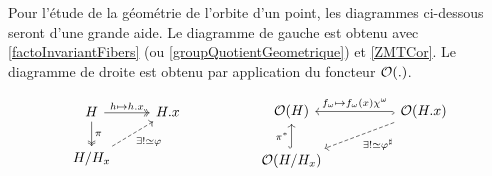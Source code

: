 Pour l'étude de la géométrie de l'orbite d'un point, les diagrammes ci-dessous seront d'une grande aide. Le diagramme de gauche est obtenu avec \ref{factoInvariantFibers} (ou \ref{groupQuotientGeometrique}) et \ref{ZMTCor}. Le diagramme de droite est obtenu par application du foncteur $\mathcal{O}(.)$.

	\begin{equation}\label{eq:DiagOrbite1}
	\begin{tikzcd}
		H \arrow[r,"h \mapsto h.x", twoheadrightarrow] \arrow[d,"\pi", twoheadrightarrow] & H.x \\
		H/H_x \arrow[ru, "\exists !\simeq \phi", swap, dashed]
	\end{tikzcd}
	\,\,\,\,\,\,\,\,\,\,\,\,\,\,\,\,\,\,\,\,\,\,\,\,\,\,\,\,\,\,
	\begin{tikzcd}
		\Oo(H) & & \Oo(H.x) \arrow[lld, "\exists !\simeq \phi^\sharp", dashed]\arrow[ll, hook, "f_\omega \mapsto f_\omega(x)\chi^{\omega}", swap]  \\
		\Oo(H/H_x)  \arrow[u,"\pi^*", hook]  & &
	\end{tikzcd}
	\end{equation}



